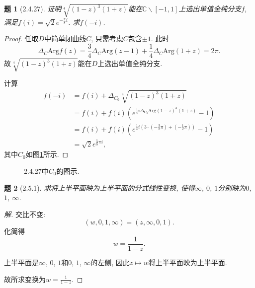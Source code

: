 \documentclass{article}[a4paper, 12pt]
\newtheorem{problem}{题}
\newenvironment{solution}{\begin{proof}[解]}{\end{proof}}
\begin{document}
\begin{problem}[2.4.27]
  证明\(\sqrt[4]{(1-z)^3(1+z)}\)能在\(\mathbb{C}\backslash[-1,1]\)上选出单值全纯分支\(f\), 满足\(f(i)=\sqrt2e^{-\frac{\pi}{8}i}\). 求\(f(-i)\).
\end{problem}

\begin{proof}
  任取\(D\)中简单闭曲线\(C\), 只需考虑\(C\)包含\(\pm 1\). 此时\[\Delta_C\mathrm{Arg}f(z)=\frac{3}{4}\Delta_C\mathrm{Arg}(z-1)+\frac14\Delta_C\mathrm{Arg}(1+z)=2\pi.\]
  故\(\sqrt[4]{(1-z)^3(1+z)}\)能在\(D\)上选出单值全纯分支.

  计算
  \begin{align*}
    f(-i)&=f(i)+\Delta_{C_0}\sqrt[4]{(1-z)^3(1+z)}\\
    &=f(i)+f(i)\left(e^{\frac14i\Delta_{C_0}\mathrm{Arg}(1-z)^3(1+z)}-1\right)\\
    &=f(i)+f(i)\left(e^{\frac14i(3\cdot(-\frac{3}{2}\pi)+(-\frac{1}{2}\pi))}-1\right)\\
    &=\sqrt2e^{\frac{5}{8}\pi i},
  \end{align*}
  其中\(C_0\)如图\ref{fig:2}所示.
\end{proof}

\begin{figure}[htbp]
  \centering
  \caption{2.4.27中\(C_0\)的图示.}
  \label{fig:2}
  \end{figure}

\begin{problem}[2.5.1]
  求将上半平面映为上半平面的分式线性变换, 使得\(\infty\), \(0\), \(1\)分别映为\(0\), \(1\), \(\infty\).
\end{problem}

\begin{solution}
  交比不变:
  \[(w, 0, 1, \infty)=(z,\infty,0,1).\]
  化简得
  \[w=\frac{1}{1-z}.\]

  上半平面是\(\infty\), \(0\), \(1\)和\(0\), \(1\), \(\infty\)的左侧, 因此\(z\mapsto w\)将上半平面映为上半平面.

  故所求变换为\(w=\frac{1}{1-z}\).
\end{solution}
\end{document}

